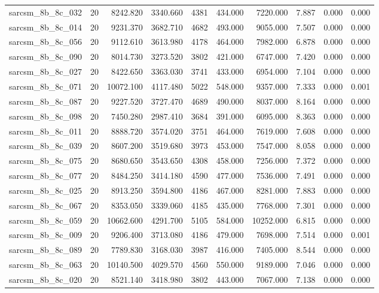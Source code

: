 \begin{tabular}{lrrrrrrrrr}
sarcsm\_8b\_8c\_032 & 20 & 8242.820 & 3340.660 & 4381 & 434.000 & 7220.000 & 7.887 & 0.000 & 0.000 \\
sarcsm\_8b\_8c\_014 & 20 & 9231.370 & 3682.710 & 4682 & 493.000 & 9055.000 & 7.507 & 0.000 & 0.000 \\
sarcsm\_8b\_8c\_056 & 20 & 9112.610 & 3613.980 & 4178 & 464.000 & 7982.000 & 6.878 & 0.000 & 0.000 \\
sarcsm\_8b\_8c\_090 & 20 & 8014.730 & 3273.520 & 3802 & 421.000 & 6747.000 & 7.420 & 0.000 & 0.000 \\
sarcsm\_8b\_8c\_027 & 20 & 8422.650 & 3363.030 & 3741 & 433.000 & 6954.000 & 7.104 & 0.000 & 0.000 \\
sarcsm\_8b\_8c\_071 & 20 & 10072.100 & 4117.480 & 5022 & 548.000 & 9357.000 & 7.333 & 0.000 & 0.001 \\
sarcsm\_8b\_8c\_087 & 20 & 9227.520 & 3727.470 & 4689 & 490.000 & 8037.000 & 8.164 & 0.000 & 0.000 \\
sarcsm\_8b\_8c\_098 & 20 & 7450.280 & 2987.410 & 3684 & 391.000 & 6095.000 & 8.363 & 0.000 & 0.000 \\
sarcsm\_8b\_8c\_011 & 20 & 8888.720 & 3574.020 & 3751 & 464.000 & 7619.000 & 7.608 & 0.000 & 0.000 \\
sarcsm\_8b\_8c\_039 & 20 & 8607.200 & 3519.680 & 3973 & 453.000 & 7547.000 & 8.058 & 0.000 & 0.000 \\
sarcsm\_8b\_8c\_075 & 20 & 8680.650 & 3543.650 & 4308 & 458.000 & 7256.000 & 7.372 & 0.000 & 0.000 \\
sarcsm\_8b\_8c\_077 & 20 & 8484.250 & 3414.180 & 4590 & 477.000 & 7536.000 & 7.491 & 0.000 & 0.000 \\
sarcsm\_8b\_8c\_025 & 20 & 8913.250 & 3594.800 & 4186 & 467.000 & 8281.000 & 7.883 & 0.000 & 0.000 \\
sarcsm\_8b\_8c\_067 & 20 & 8353.050 & 3339.060 & 4185 & 435.000 & 7768.000 & 7.301 & 0.000 & 0.000 \\
sarcsm\_8b\_8c\_059 & 20 & 10662.600 & 4291.700 & 5105 & 584.000 & 10252.000 & 6.815 & 0.000 & 0.000 \\
sarcsm\_8b\_8c\_009 & 20 & 9206.400 & 3713.080 & 4186 & 479.000 & 7698.000 & 7.514 & 0.000 & 0.001 \\
sarcsm\_8b\_8c\_089 & 20 & 7789.830 & 3168.030 & 3987 & 416.000 & 7405.000 & 8.544 & 0.000 & 0.000 \\
sarcsm\_8b\_8c\_063 & 20 & 10140.500 & 4029.570 & 4560 & 550.000 & 9189.000 & 7.046 & 0.000 & 0.000 \\
sarcsm\_8b\_8c\_020 & 20 & 8521.140 & 3418.980 & 3802 & 443.000 & 7067.000 & 7.138 & 0.000 & 0.000 \\

\end{tabular}
